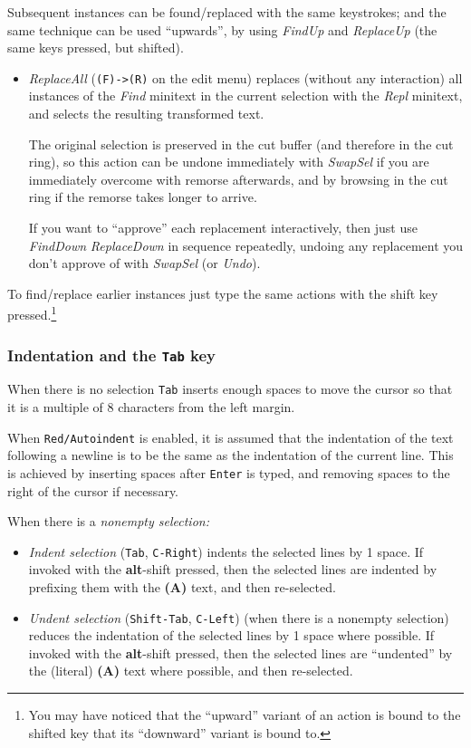 \documentclass[11pt,a4paper]{article}
\begin{document}
Subsequent instances can be found/replaced with the same keystrokes;
and the same technique can be used ``upwards'', by using \emph{FindUp}
and \emph{ReplaceUp} (the same keys pressed, but shifted).

\begin{itemize}
\item
  \emph{ReplaceAll} (\texttt{(F)-\textgreater{}(R)} on the edit menu)
  replaces (without any interaction) all instances of the \emph{Find}
  minitext in the current selection with the \emph{Repl} minitext, and
  selects the resulting transformed text.

  The original selection is preserved in the cut buffer (and therefore
  in the cut ring), so this action can be undone immediately with
  \emph{SwapSel} if you are immediately overcome with remorse
  afterwards, and by browsing in the cut ring if the remorse takes
  longer to arrive.

  If you want to ``approve'' each replacement interactively, then just
  use \emph{FindDown} \emph{ReplaceDown} in sequence repeatedly, undoing
  any replacement you don't approve of with \emph{SwapSel} (or
  \emph{Undo}).
\end{itemize}

To find/replace earlier instances just type the same actions with
the shift key pressed.\footnote{You may have noticed that the
``upward'' variant of an action is bound to the shifted key that
its ``downward'' variant is bound to.}






\hypertarget{indentation}{%
\subsubsection{Indentation and the \texttt{Tab} key}\label{indentation}}

When there is no selection \texttt{Tab} inserts enough spaces to
move the cursor so that it is a multiple of 8 characters from the left
margin.

When \texttt{Red/Autoindent} is enabled, it is assumed that the
indentation of the text following a newline is to be the same as the
indentation of the current line. This is achieved by inserting spaces
after \texttt{Enter} is typed, and removing spaces to the right of the
cursor if necessary.

When there is a \textit{nonempty selection:}

\begin{itemize}
\item
  \emph{Indent selection} (\texttt{Tab}, \texttt{C-Right}) indents the selected lines by 1
  space. If invoked with the \textbf{alt}-shift pressed, then the
  selected lines are indented by prefixing them with the \textbf{(A)}
  text, and then re-selected.
\item
  \emph{Undent selection} (\texttt{Shift-Tab}, \texttt{C-Left}) (when there is a nonempty
  selection) reduces the indentation of the selected lines by 1 space
  where possible. If invoked with the \textbf{alt}-shift pressed, then
  the selected lines are ``undented'' by the (literal) \textbf{(A)} text
  where possible, and then re-selected.
\end{itemize}
\end{document}
